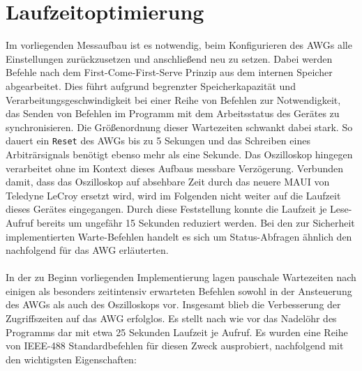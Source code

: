 \documentclass[../Report.tex]{subfiles}
\begin{document}
\section{Laufzeitoptimierung}
Im vorliegenden Messaufbau ist es notwendig, beim Konfigurieren des AWGs alle Einstellungen zurückzusetzen und anschließend neu zu setzen. Dabei werden Befehle nach dem First-Come-First-Serve Prinzip aus dem internen Speicher abgearbeitet. Dies führt aufgrund begrenzter Speicherkapazität und Verarbeitungsgeschwindigkeit bei einer Reihe von Befehlen zur Notwendigkeit, das Senden von Befehlen im Programm mit dem Arbeitsstatus des Gerätes zu synchronisieren. 
Die Größenordnung dieser Wartezeiten schwankt dabei stark. So dauert ein \lstinline{Re}\lstinline{set} des AWGs bis zu 5 Sekungen und das Schreiben eines Arbiträrsignals benötigt ebenso mehr als eine Sekunde. Das Oszilloskop hingegen verarbeitet ohne im Kontext dieses Aufbaus messbare Verzögerung. Verbunden damit, dass das Oszilloskop auf absehbare Zeit durch das neuere MAUI von Teledyne LeCroy ersetzt wird, wird im Folgenden nicht weiter auf die Laufzeit dieses Gerätes eingegangen. Durch diese Feststellung konnte die Laufzeit je Lese-Aufruf bereits um ungefähr 15 Sekunden reduziert werden.
Bei den zur Sicherheit implementierten Warte-Befehlen handelt es sich um Status-Abfragen ähnlich den nachfolgend für das AWG erläuterten.
\\
\\
\noindent
In der zu Beginn vorliegenden Implementierung lagen pauschale Wartezeiten nach einigen als besonders zeitintensiv erwarteten Befehlen sowohl in der Ansteuerung des AWGs als auch des Oszilloskops vor. 
Insgesamt blieb die Verbesserung der Zugriffszeiten auf das AWG erfolglos. Es stellt nach wie vor das Nadelöhr des Programms dar mit etwa 25 Sekunden Laufzeit je Aufruf. 
Es wurden eine Reihe von IEEE-488 Standardbefehlen für diesen Zweck ausprobiert, nachfolgend mit den wichtigsten Eigenschaften:
\end{document}
